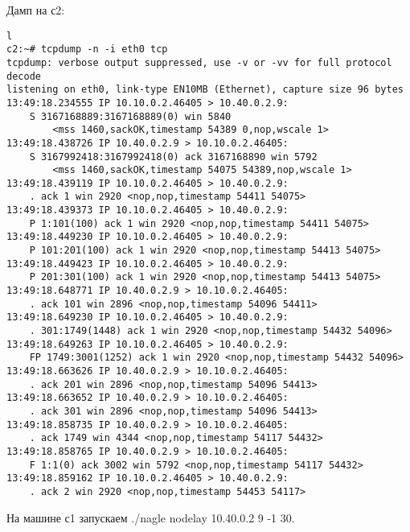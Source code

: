 \documentclass[a4paper,12pt]{article}
\begin{document}
Дамп на с2:
\begin{Verbatim}
l
c2:~# tcpdump -n -i eth0 tcp
tcpdump: verbose output suppressed, use -v or -vv for full protocol decode
listening on eth0, link-type EN10MB (Ethernet), capture size 96 bytes
13:49:18.234555 IP 10.10.0.2.46405 > 10.40.0.2.9: 
    S 3167168889:3167168889(0) win 5840 
        <mss 1460,sackOK,timestamp 54389 0,nop,wscale 1>
13:49:18.438726 IP 10.40.0.2.9 > 10.10.0.2.46405: 
    S 3167992418:3167992418(0) ack 3167168890 win 5792 
        <mss 1460,sackOK,timestamp 54075 54389,nop,wscale 1>
13:49:18.439119 IP 10.10.0.2.46405 > 10.40.0.2.9: 
    . ack 1 win 2920 <nop,nop,timestamp 54411 54075>
13:49:18.439373 IP 10.10.0.2.46405 > 10.40.0.2.9: 
    P 1:101(100) ack 1 win 2920 <nop,nop,timestamp 54411 54075>
13:49:18.449230 IP 10.10.0.2.46405 > 10.40.0.2.9: 
    P 101:201(100) ack 1 win 2920 <nop,nop,timestamp 54413 54075>
13:49:18.449423 IP 10.10.0.2.46405 > 10.40.0.2.9: 
    P 201:301(100) ack 1 win 2920 <nop,nop,timestamp 54413 54075>
13:49:18.648771 IP 10.40.0.2.9 > 10.10.0.2.46405: 
    . ack 101 win 2896 <nop,nop,timestamp 54096 54411>
13:49:18.649230 IP 10.10.0.2.46405 > 10.40.0.2.9: 
    . 301:1749(1448) ack 1 win 2920 <nop,nop,timestamp 54432 54096>
13:49:18.649263 IP 10.10.0.2.46405 > 10.40.0.2.9: 
    FP 1749:3001(1252) ack 1 win 2920 <nop,nop,timestamp 54432 54096>
13:49:18.663626 IP 10.40.0.2.9 > 10.10.0.2.46405: 
    . ack 201 win 2896 <nop,nop,timestamp 54096 54413>
13:49:18.663652 IP 10.40.0.2.9 > 10.10.0.2.46405: 
    . ack 301 win 2896 <nop,nop,timestamp 54096 54413>
13:49:18.858735 IP 10.40.0.2.9 > 10.10.0.2.46405: 
    . ack 1749 win 4344 <nop,nop,timestamp 54117 54432>
13:49:18.858765 IP 10.40.0.2.9 > 10.10.0.2.46405: 
    F 1:1(0) ack 3002 win 5792 <nop,nop,timestamp 54117 54432>
13:49:18.859162 IP 10.10.0.2.46405 > 10.40.0.2.9: 
    . ack 2 win 2920 <nop,nop,timestamp 54453 54117>
\end{Verbatim}

На машине с1 запускаем ./nagle nodelay 10.40.0.2 9 -1 30.
\end{document}
